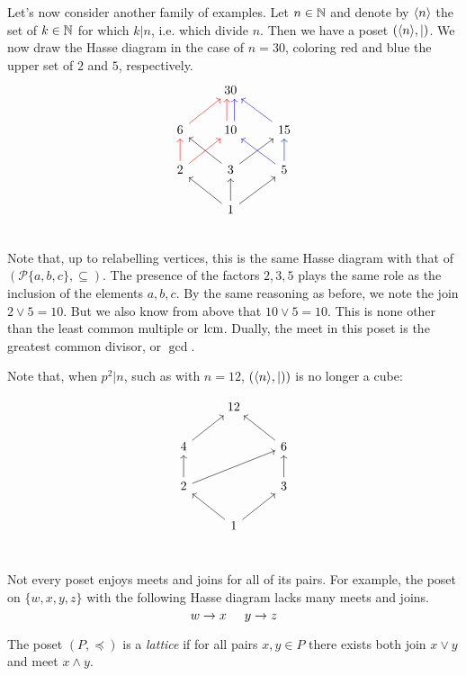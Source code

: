 Let's now consider another family of examples. Let $n\in\mathbb N$ and denote by $\langle n \rangle$ the set of $k\in\mathbb N$ for which $k|n$, i.e. which divide $n$. Then we have a poset $(\langle n \rangle,|)$. We now draw the Hasse diagram in the case of $n=30$, coloring red and blue the upper set of $2$ and $5$, respectively.
\begin{equation}
\begin{tikzcd}
 & 30 & \\
 6 \arrow[ur,red] & 10 \arrow[u,red,shift left = 0.7 ex] \arrow[u,blue,shift right = 0.7 ex]   & 15 \arrow[ul,blue] \\
 2 \arrow[u, red] \arrow[ur,red] & 3 \arrow[ul] \arrow[ur] & 5 \arrow[u,blue] \arrow[ul,blue] \\
 & 1 \arrow[ul] \arrow[u] \arrow[ur] & \\
\end{tikzcd}
\end{equation}
Note that, up to relabelling vertices, this is the same Hasse diagram with that of $(\mathcal{P}\{a,b,c\},\subseteq)$. The presence of the factors $2,3,5$ plays the same role as the inclusion of the elements $a,b,c$. By the same reasoning as before, we note the join $2\vee 5=10$. But we also know from above that $10\vee 5=10$. This is none other than the least common multiple or $\operatorname{lcm}$. Dually, the meet in this poset is the greatest common divisor, or $\gcd$.

Note that, when $p^2|n$, such as with $n=12$, $(\langle n \rangle,|))$ is no longer a cube:

\begin{equation}
\begin{tikzcd}
 & 12 & \\
 4 \arrow[ur] &  & 6 \arrow[ul] \\
 2\arrow[u] \ar[urr] &  & 3 \arrow[u]\\
 & 1 \arrow[ul] \arrow[ur] & \\
\end{tikzcd}
\end{equation}

Not every poset enjoys meets and joins for all of its pairs. For example, the poset on $\{w,x,y,z\}$ with the following Hasse diagram lacks many meets and joins.
\[w\to x\hspace{5 mm} y\to z\]
\begin{dfn}
The poset $(P,\preceq)$ is a \emph{lattice} if for all pairs $x,y\in P$ there exists both join $x\vee y$ and meet $x\wedge y$.
\end{dfn}


